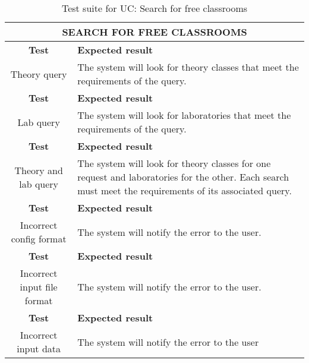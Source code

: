 \begin{table}[H]
    \centering
    \caption{Test suite for UC: Search for free classrooms}
    \label{uc-table-assignments}
    \begin{tabular}{|c|p{8cm}|}
        \hline
        \multicolumn{2}{|c|}{\textbf{SEARCH FOR FREE CLASSROOMS}} \\
        \hline
        \rowcolor{blue!10}
        \textbf{Test} & \textbf{Expected result} \\
        \rowcolor{blue!30}
        Theory query & The system will look for theory classes that meet the requirements of the query. \\
        \rowcolor{blue!10}
        \textbf{Test} & \textbf{Expected result} \\
        \rowcolor{blue!30}
        Lab query & The system will look for laboratories that meet the requirements of the query. \\
        \rowcolor{blue!10}
        \textbf{Test} & \textbf{Expected result} \\
        \rowcolor{blue!30}
        Theory and lab query & The system will look for theory classes for one request and laboratories for the other. Each search must meet the requirements of its associated query. \\
        \textbf{Test} & \textbf{Expected result} \\
        \rowcolor{blue!30}
        Incorrect config format & The system will notify the error to the user. \\
        \rowcolor{blue!10}
        \textbf{Test} & \textbf{Expected result} \\
        \rowcolor{blue!30}
        Incorrect input file format & The system will notify the error to the user. \\
        \rowcolor{blue!10}
        \textbf{Test} & \textbf{Expected result} \\
        \rowcolor{blue!30}
        Incorrect input data & The system will notify the error to the user \\
        \hline
    \end{tabular}
\end{table}


